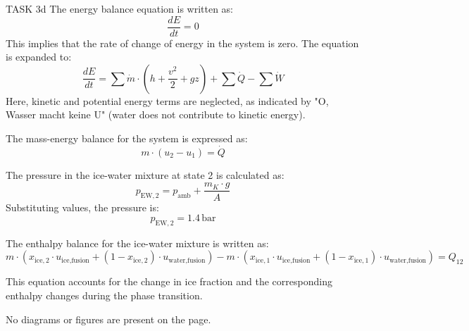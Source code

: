 TASK 3d  
The energy balance equation is written as:  
\[
\frac{dE}{dt} = 0
\]  
This implies that the rate of change of energy in the system is zero. The equation is expanded to:  
\[
\frac{dE}{dt} = \sum \dot{m} \cdot \left( h + \frac{v^2}{2} + gz \right) + \sum \dot{Q} - \sum \dot{W}
\]  
Here, kinetic and potential energy terms are neglected, as indicated by "O, Wasser macht keine U" (water does not contribute to kinetic energy).  

The mass-energy balance for the system is expressed as:  
\[
m \cdot (u_2 - u_1) = \dot{Q}
\]  

The pressure in the ice-water mixture at state 2 is calculated as:  
\[
p_{\text{EW},2} = p_{\text{amb}} + \frac{m_K \cdot g}{A}
\]  
Substituting values, the pressure is:  
\[
p_{\text{EW},2} = 1.4 \, \text{bar}
\]  

The enthalpy balance for the ice-water mixture is written as:  
\[
m \cdot \left( x_{\text{ice},2} \cdot u_{\text{ice},\text{fusion}} + (1 - x_{\text{ice},2}) \cdot u_{\text{water},\text{fusion}} \right) - m \cdot \left( x_{\text{ice},1} \cdot u_{\text{ice},\text{fusion}} + (1 - x_{\text{ice},1}) \cdot u_{\text{water},\text{fusion}} \right) = Q_{12}
\]  

This equation accounts for the change in ice fraction and the corresponding enthalpy changes during the phase transition.  

No diagrams or figures are present on the page.